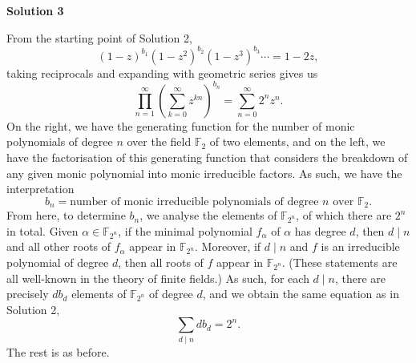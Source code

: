 \begin{enumerate}
 



\textbf{Solution 3}

From the starting point of Solution 2,
 \[(1 - z)^{b_1}(1 - z^2)^{b_2}(1 - z^3)^{b_3}\cdots = 1 - 2z,\]taking reciprocals and expanding with geometric series gives us
 \[\prod_{n = 1}^{\infty}\left(\sum_{k = 0}^{\infty} z^{kn}\right)^{b_n} = \sum_{n = 0}^{\infty} 2^nz^n.\]On the right, we have the generating function for the number of monic polynomials of degree $n$ over the field $\mathbb{F}_2$ of two elements, and on the left, we have the factorisation of this generating function that considers the breakdown of any given monic polynomial into monic irreducible factors. As such, we have the interpretation
 \[b_n = \text{number of monic irreducible polynomials of degree }n\text{ over }\mathbb{F}_2.\]From here, to determine $b_n$, we analyse the elements of $\mathbb{F}_{2^n}$, of which there are $2^{n}$ in total. Given $\alpha\in\mathbb{F}_{2^n}$, if the minimal polynomial $f_{\alpha}$ of $\alpha$ has degree $d$, then $d\mid n$ and all other roots of $f_{\alpha}$ appear in $\mathbb{F}_{2^n}$. Moreover, if $d\mid n$ and $f$ is an irreducible polynomial of degree $d$, then all roots of $f$ appear in $\mathbb{F}_{2^n}$. (These statements are all well-known in the theory of finite fields.) As such, for each $d\mid n$, there are precisely $db_d$ elements of $\mathbb{F}_{2^n}$ of degree $d$, and we obtain the same equation as in Solution 2,
 \[\sum_{d\mid n} db_d = 2^n.\]The rest is as before.

 


 


\end{enumerate}